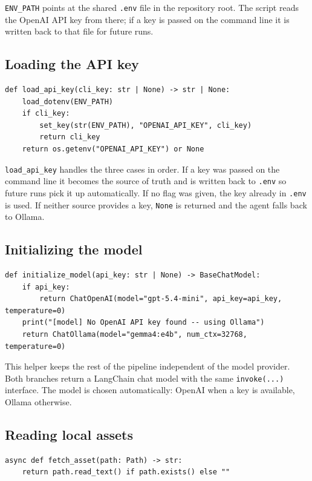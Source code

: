 \documentclass[12pt, a4paper]{article}
\begin{document}
\texttt{ENV\_PATH} points at the shared \texttt{.env} file in the repository root. The script reads the OpenAI API key from there; if a key is passed on the command line it is written back to that file for future runs.

\subsection{Loading the API key}

\begin{lstlisting}[style=pythonstyle]
def load_api_key(cli_key: str | None) -> str | None:
    load_dotenv(ENV_PATH)
    if cli_key:
        set_key(str(ENV_PATH), "OPENAI_API_KEY", cli_key)
        return cli_key
    return os.getenv("OPENAI_API_KEY") or None
\end{lstlisting}

\texttt{load\_api\_key} handles the three cases in order. If a key was passed on the command line it becomes the source of truth and is written back to \texttt{.env} so future runs pick it up automatically. If no flag was given, the key already in \texttt{.env} is used. If neither source provides a key, \texttt{None} is returned and the agent falls back to Ollama.

\subsection{Initializing the model}

\begin{lstlisting}[style=pythonstyle]
def initialize_model(api_key: str | None) -> BaseChatModel:
    if api_key:
        return ChatOpenAI(model="gpt-5.4-mini", api_key=api_key, temperature=0)
    print("[model] No OpenAI API key found -- using Ollama")
    return ChatOllama(model="gemma4:e4b", num_ctx=32768, temperature=0)
\end{lstlisting}

This helper keeps the rest of the pipeline independent of the model provider. Both branches return a LangChain chat model with the same \texttt{invoke(...)} interface. The model is chosen automatically: OpenAI when a key is available, Ollama otherwise.

\subsection{Reading local assets}

\begin{lstlisting}[style=pythonstyle]
async def fetch_asset(path: Path) -> str:
    return path.read_text() if path.exists() else ""
\end{lstlisting}
\end{document}
